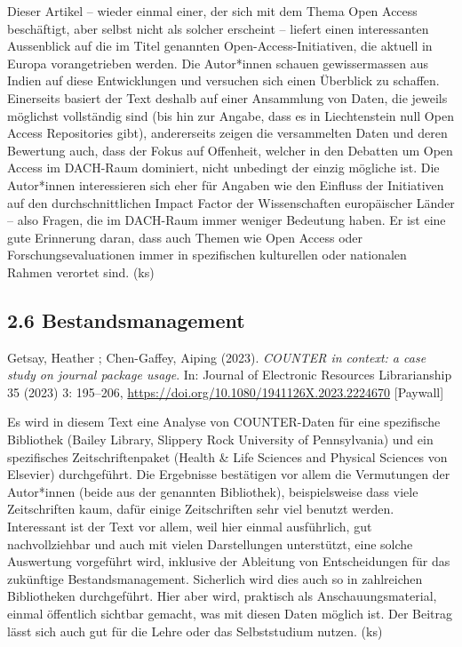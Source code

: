 \documentclass[a4paper,
fontsize=11pt,
oneside,
numbers=noperiodatend,
parskip=half-,
bibliography=totoc,
final
]{scrartcl}
\begin{document}
Dieser Artikel -- wieder einmal einer, der sich mit dem Thema Open
Access beschäftigt, aber selbst nicht als solcher erscheint -- liefert
einen interessanten Aussenblick auf die im Titel genannten
Open-Access-Initiativen, die aktuell in Europa vorangetrieben werden.
Die Autor*innen schauen gewissermassen aus Indien auf diese
Entwicklungen und versuchen sich einen Überblick zu schaffen. Einerseits
basiert der Text deshalb auf einer Ansammlung von Daten, die jeweils
möglichst vollständig sind (bis hin zur Angabe, dass es in Liechtenstein
null Open Access Repositories gibt), andererseits zeigen die
versammelten Daten und deren Bewertung auch, dass der Fokus auf
Offenheit, welcher in den Debatten um Open Access im DACH-Raum
dominiert, nicht unbedingt der einzig mögliche ist. Die Autor*innen
interessieren sich eher für Angaben wie den Einfluss der Initiativen auf
den durchschnittlichen Impact Factor der Wissenschaften europäischer
Länder -- also Fragen, die im DACH-Raum immer weniger Bedeutung haben.
Er ist eine gute Erinnerung daran, dass auch Themen wie Open Access oder
Forschungsevaluationen immer in spezifischen kulturellen oder nationalen
Rahmen verortet sind. (ks)

\hypertarget{bestandsmanagement}{%
\subsection{2.6 Bestandsmanagement}\label{bestandsmanagement}}

Getsay, Heather ; Chen-Gaffey, Aiping (2023). \emph{COUNTER in context:
a case study on journal package usage}. In: Journal of Electronic
Resources Librarianship 35 (2023) 3: 195--206,
\url{https://doi.org/10.1080/1941126X.2023.2224670} {[}Paywall{]}

Es wird in diesem Text eine Analyse von COUNTER-Daten für eine
spezifische Bibliothek (Bailey Library, Slippery Rock University of
Pennsylvania) und ein spezifisches Zeitschriftenpaket (Health \& Life
Sciences and Physical Sciences von Elsevier) durchgeführt. Die
Ergebnisse bestätigen vor allem die Vermutungen der Autor*innen (beide
aus der genannten Bibliothek), beispielsweise dass viele Zeitschriften
kaum, dafür einige Zeitschriften sehr viel benutzt werden. Interessant
ist der Text vor allem, weil hier einmal ausführlich, gut
nachvollziehbar und auch mit vielen Darstellungen unterstützt, eine
solche Auswertung vorgeführt wird, inklusive der Ableitung von
Entscheidungen für das zukünftige Bestandsmanagement. Sicherlich wird
dies auch so in zahlreichen Bibliotheken durchgeführt. Hier aber wird,
praktisch als Anschauungsmaterial, einmal öffentlich sichtbar gemacht,
was mit diesen Daten möglich ist. Der Beitrag lässt sich auch gut für
die Lehre oder das Selbststudium nutzen. (ks)
\end{document}
